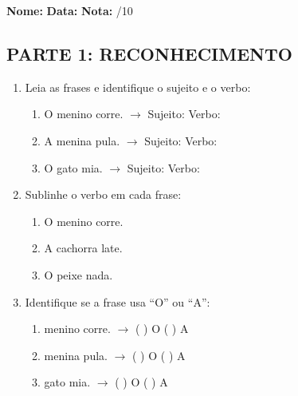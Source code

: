\begin{exercicio}
\noindent\textbf{Nome:} \underline{\hspace{3.2cm}} \quad \textbf{Data:} \underline{\hspace{1.6cm}} \quad \textbf{Nota:} \underline{\hspace{0.9cm}}/10

\subsection*{PARTE 1: RECONHECIMENTO}

\begin{enumerate}
  \item Leia as frases e identifique o sujeito e o verbo:
  \begin{enumerate}[label=\alph*)]
    \item O menino corre. $\rightarrow$ Sujeito: \underline{\hspace{3cm}} Verbo: \underline{\hspace{2cm}}
    \item A menina pula. $\rightarrow$ Sujeito: \underline{\hspace{3cm}} Verbo: \underline{\hspace{2cm}}
    \item O gato mia. $\rightarrow$ Sujeito: \underline{\hspace{3cm}} Verbo: \underline{\hspace{2cm}}
  \end{enumerate}

  \item Sublinhe o verbo em cada frase:
  \begin{enumerate}[label=\alph*)]
    \item O menino corre.
    \item A cachorra late.
    \item O peixe nada.
  \end{enumerate}

  \item Identifique se a frase usa ``O'' ou ``A'':
  \begin{enumerate}[label=\alph*)]
    \item \underline{\hspace{0.5cm}} menino corre. $\rightarrow$ ( ) O ( ) A
    \item \underline{\hspace{0.5cm}} menina pula. $\rightarrow$ ( ) O ( ) A
    \item \underline{\hspace{0.5cm}} gato mia. $\rightarrow$ ( ) O ( ) A
  \end{enumerate}


\end{enumerate}
\end{exercicio}
